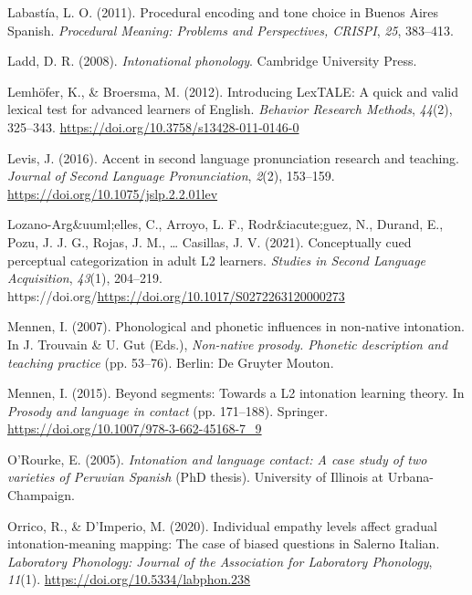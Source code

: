 \documentclass[]{article}
\newlength{\cslhangindent}
\newenvironment{CSLReferences}[2] %
 {%
  \setlength{\parindent}{0pt}
  \ifodd #1 \everypar{\setlength{\hangindent}{\cslhangindent}}\ignorespaces\fi
  \ifnum #2 > 0
  \setlength{\parskip}{#2\baselineskip}
  \fi
 }%
 {}
\begin{document}
\begin{CSLReferences}{1}{0}
\leavevmode{}%
Labastía, L. O. (2011). Procedural encoding and tone choice in {Buenos Aires Spanish}. \emph{Procedural Meaning: Problems and Perspectives, CRISPI}, \emph{25}, 383--413.

\leavevmode{}%
Ladd, D. R. (2008). \emph{Intonational phonology}. Cambridge University Press.

\leavevmode{}%
Lemhöfer, K., \& Broersma, M. (2012). Introducing LexTALE: A quick and valid lexical test for advanced learners of {E}nglish. \emph{Behavior Research Methods}, \emph{44}(2), 325--343. \url{https://doi.org/10.3758/s13428-011-0146-0}

\leavevmode{}%
Levis, J. (2016). Accent in second language pronunciation research and teaching. \emph{Journal of Second Language Pronunciation}, \emph{2}(2), 153--159. \url{https://doi.org/10.1075/jslp.2.2.01lev}

\leavevmode{}%
Lozano-Arg\&uuml;elles, C., Arroyo, L. F., Rodr\&iacute;guez, N., Durand, E., Pozu, J. J. G., Rojas, J. M., \ldots{} Casillas, J. V. (2021). Conceptually cued perceptual categorization in adult {L}2 learners. \emph{Studies in Second Language Acquisition}, \emph{43}(1), 204--219. https://doi.org/\url{https://doi.org/10.1017/S0272263120000273}

\leavevmode{}%
Mennen, I. (2007). Phonological and phonetic influences in non-native intonation. In J. Trouvain \& U. Gut (Eds.), \emph{Non-native prosody. Phonetic description and teaching practice} (pp. 53--76). Berlin: De Gruyter Mouton.

\leavevmode{}%
Mennen, I. (2015). Beyond segments: {T}owards a {L}2 intonation learning theory. In \emph{Prosody and language in contact} (pp. 171--188). Springer. \url{https://doi.org/10.1007/978-3-662-45168-7_9}

\leavevmode{}%
O'Rourke, E. (2005). \emph{Intonation and language contact: {A} case study of two varieties of {P}eruvian {S}panish} (PhD thesis). {University of Illinois at Urbana-Champaign}.

\leavevmode{}%
Orrico, R., \& D'Imperio, M. (2020). Individual empathy levels affect gradual intonation-meaning mapping: The case of biased questions in {S}alerno {I}talian. \emph{Laboratory Phonology: Journal of the Association for Laboratory Phonology}, \emph{11}(1). \url{https://doi.org/10.5334/labphon.238}


\end{CSLReferences}
\end{document}

